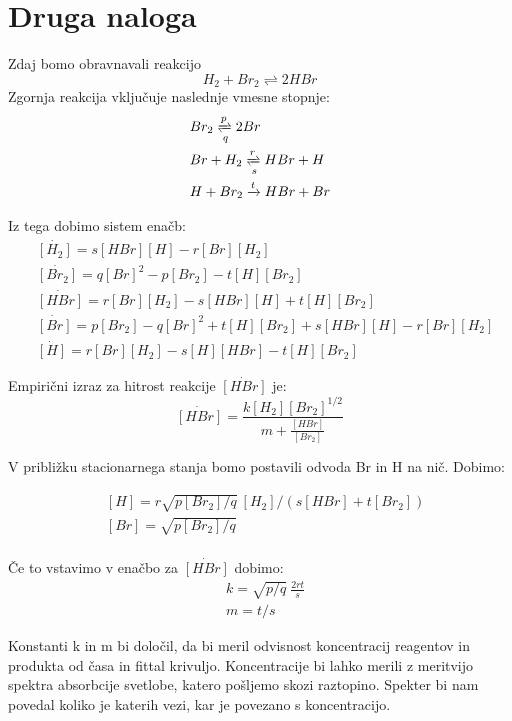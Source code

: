 \documentclass{article}
\begin{document}
\section{Druga naloga}

Zdaj bomo obravnavali reakcijo
\begin{equation*}
H_2 + Br_2 \rightleftharpoons 2HBr
\end{equation*}
Zgornja reakcija vključuje naslednje vmesne stopnje:
\begin{align*}
&Br_2 \xrightleftharpoons[q]{p} 2Br \\
&Br + H_2 \xrightleftharpoons[s]{r} HBr + H \\
&H + Br_2 \xrightarrow{t} HBr + Br 
\end{align*}

Iz tega dobimo sistem enačb:
\begin{align*}
&\dot{[H_2]} = s[HBr][H] - r[Br][H_2] \\
&\dot{[Br_2]} = q[Br]^2 -p[Br_2] - t [H][Br_2] \\
&\dot{[HBr]} = r[Br][H_2] - s[HBr][H] + t[H][Br_2] \\
&\dot{[Br]} = p[Br_2] - q[Br]^2 + t[H][Br_2] +s[HBr][H] - r[Br][H_2]\\
&\dot{[H]} = r[Br][H_2] - s[H][HBr] - t[H][Br_2]
\end{align*}

Empirični izraz za hitrost reakcije $\dot{[HBr]}$ je:
\begin{equation*}
\dot{[HBr]} = \frac{k[H_2][Br_2]^{1/2}}{m+\frac{[HBr]}{[Br_2]}}
\end{equation*}

V približku stacionarnega stanja bomo postavili odvoda Br in H na nič. Dobimo:

\begin{align*}
&[H] = r\sqrt{p[Br_2]/q}\ [H_2]/(s[HBr] + t[Br_2]) \\
&[Br] =  \sqrt{p[Br_2]/q}\\
\end{align*}

Če to vstavimo v enačbo za $\dot{[HBr]}$ dobimo:
\begin{align*}
&k = \sqrt{p/q}\ \frac{2rt}{s} \\
&m = t/s
\end{align*}

Konstanti k in m bi določil, da bi meril odvisnost koncentracij reagentov in produkta od časa in fittal krivuljo.
Koncentracije bi lahko merili z meritvijo spektra absorbcije svetlobe, katero pošljemo skozi raztopino. Spekter bi nam povedal koliko je katerih vezi, kar je povezano s koncentracijo.
\end{document}
